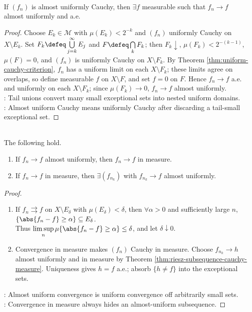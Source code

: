 \begin{lemma} \label{lem:almost-uniform-cauchy-has-ae-limit} \\
If $(f_n)$ is almost uniformly Cauchy, then $\exists f$ measurable such that $f_n\to f$ almost uniformly and a.e.
\begin{proof}
Choose $E_k\in\mathcal{M}$ with $\mu(E_k)<2^{-k}$ and $(f_n)$ uniformly Cauchy on $X\setminus E_k$. Set $F_k\defeq\bigcup\limits_{j=k}^{\infty}E_j$ and $F\defeq\bigcap\limits_kF_k$; then $F_k\downarrow$, $\mu(F_k)<2^{-(k-1)}$, $\mu(F)=0$, and $(f_n)$ is uniformly Cauchy on $X\setminus F_k$. By Theorem \ref{thm:uniform-cauchy-criterion}, $f_n$ has a uniform limit on each $X\setminus F_k$; these limits agree on overlaps, so define measurable $f$ on $X\setminus F$, and set $f=0$ on $F$. Hence $f_n\to f$ a.e. and uniformly on each $X\setminus F_k$; since $\mu(F_k)\to0$, $f_n\to f$ almost uniformly.\\
: Tail unions convert many small exceptional sets into nested uniform domains.\\
: Almost uniform Cauchy means uniformly Cauchy after discarding a tail-small exceptional set.
\end{proof}
\end{lemma}

\begin{theorem} \label{thm:almost-uniform-and-measure-subsequences} \\
The following hold.
\begin{enumerate}[label=(\roman*)]
\setlength{\itemsep}{0pt}
\item If $f_n\to f$ almost uniformly, then $f_n\to f$ in measure.
\item If $f_n\to f$ in measure, then $\exists(f_{n_k})$ with $f_{n_k}\to f$ almost uniformly.
\end{enumerate}
\begin{proof}
\begin{enumerate}[label=(\roman*)]
\setlength{\itemsep}{0pt}
\item If $f_n\rightrightarrows f$ on $X\setminus E_\delta$ with $\mu(E_\delta)<\delta$, then $\forall\alpha>0$ and sufficiently large $n$, $\{\abs{f_n-f}\geq\alpha\}\subseteq E_\delta$.\\
Thus $\limsup\limits_n\mu\{\abs{f_n-f}\geq\alpha\}\leq\delta$, and let $\delta\downarrow0$.
\item Convergence in measure makes $(f_n)$ Cauchy in measure. Choose $f_{n_k}\to h$ almost uniformly and in measure by Theorem \ref{thm:riesz-subsequence-cauchy-measure}. Uniqueness gives $h=f$ a.e.; absorb $\{h\neq f\}$ into the exceptional sets.
\end{enumerate}
: Almost uniform convergence is uniform convergence off arbitrarily small sets.\\
: Convergence in measure always hides an almost-uniform subsequence.
\end{proof}
\end{theorem}


